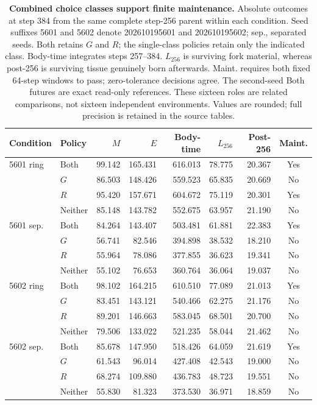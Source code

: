 \begin{table}[p]
\centering
\small
\setlength{\tabcolsep}{3.5pt}
\begin{tabular}{llrrrrrc}
\toprule
Condition & Policy & $M$ & $E$ & Body-time & $L_{256}$ & Post-256 & Maint. \\
\midrule
5601 ring & Both & 99.142 & 165.431 & 616.013 & 78.775 & 20.367 & Yes \\
 & $G$ & 86.503 & 148.426 & 559.523 & 65.835 & 20.669 & No \\
 & $R$ & 95.420 & 157.671 & 604.672 & 75.119 & 20.301 & Yes \\
 & Neither & 85.148 & 143.782 & 552.675 & 63.957 & 21.190 & No \\
\midrule
5601 sep. & Both & 84.264 & 143.407 & 503.481 & 61.881 & 22.383 & Yes \\
 & $G$ & 56.741 & 82.546 & 394.898 & 38.532 & 18.210 & No \\
 & $R$ & 55.964 & 78.086 & 377.855 & 36.623 & 19.341 & No \\
 & Neither & 55.102 & 76.653 & 360.764 & 36.064 & 19.037 & No \\
\midrule
5602 ring & Both & 98.102 & 164.215 & 610.510 & 77.089 & 21.013 & Yes \\
 & $G$ & 83.451 & 143.121 & 540.466 & 62.275 & 21.176 & No \\
 & $R$ & 89.201 & 146.663 & 583.045 & 68.501 & 20.700 & No \\
 & Neither & 79.506 & 133.022 & 521.235 & 58.044 & 21.462 & No \\
\midrule
5602 sep. & Both & 85.678 & 147.950 & 518.426 & 64.059 & 21.619 & Yes \\
 & $G$ & 61.543 & 96.014 & 427.408 & 42.543 & 19.000 & No \\
 & $R$ & 68.274 & 109.880 & 436.783 & 48.723 & 19.551 & No \\
 & Neither & 55.830 & 81.323 & 373.530 & 36.971 & 18.859 & No \\
\bottomrule
\end{tabular}
\caption{\textbf{Combined choice classes support finite maintenance.} Absolute outcomes at step 384 from the same complete step-256 parent within each condition. Seed suffixes 5601 and 5602 denote 202610195601 and 202610195602; sep., separated seeds. Both retains $G$ and $R$; the single-class policies retain only the indicated class. Body-time integrates steps 257--384. $L_{256}$ is surviving fork material, whereas post-256 is surviving tissue genuinely born afterwards. Maint. requires both fixed 64-step windows to pass; zero-tolerance decisions agree. The second-seed Both futures are exact read-only references. These sixteen roles are related comparisons, not sixteen independent environments. Values are rounded; full precision is retained in the source tables.}
\label{tab:renewal-choice-outcomes}
\end{table}

